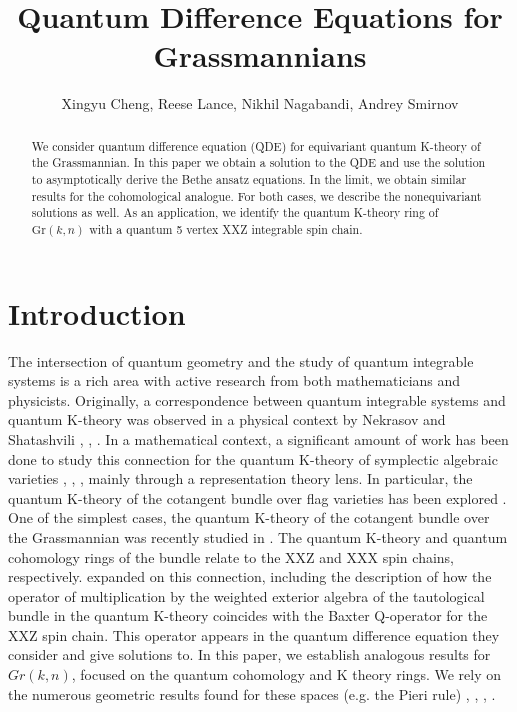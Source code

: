 \documentclass[12pt]{article}
\title{Quantum Difference Equations for Grassmannians}
\author{Xingyu Cheng, Reese Lance, Nikhil Nagabandi, Andrey Smirnov}
\date{}
\theoremstyle{plain}
\theoremstyle{definition}
\begin{document}
\maketitle


\begin{abstract}
    We consider quantum difference equation (QDE) for equivariant quantum K-theory of the Grassmannian. In this paper we obtain a solution to the QDE and use the solution to asymptotically derive the Bethe ansatz equations. In the limit, we obtain similar results for the cohomological analogue. For both cases, we describe the nonequivariant solutions as well. As an application, we identify the quantum K-theory ring of $\mathrm{Gr}(k,n)$ with a quantum 5 vertex XXZ integrable spin chain.
\end{abstract}
\tableofcontents


\section{Introduction}

The intersection of quantum geometry and the study of quantum integrable systems is a rich area with active research from both mathematicians and physicists. Originally, a correspondence between quantum integrable systems and quantum K-theory was observed in a physical context by Nekrasov and Shatashvili \cite{nekrasov2009}, \cite{nekrasovq2009}, \cite{nekrasov2010}. In a mathematical context, a significant amount of work has been done to study this connection for the quantum K-theory of symplectic algebraic varieties \cite{givental2001toda}, \cite{maulikokounkov}, \cite{Okounkov2022-tf}, mainly through a representation theory lens. 
In particular, the quantum K-theory of the cotangent bundle over flag varieties has been explored \cite{rimanyitarasovvarchenko}. One of the simplest cases, the quantum K-theory of the cotangent bundle over the Grassmannian was recently studied in \cite{pushkarsmirnovzeitlin}. The quantum K-theory and quantum cohomology rings of the bundle relate to the $\mathrm{XXZ}$ and $\mathrm{XXX}$ spin chains, respectively. \cite{pushkarsmirnovzeitlin} expanded on this connection, including the description of how the operator of multiplication by the weighted exterior algebra of the tautological bundle in the quantum K-theory coincides with the Baxter Q-operator for the XXZ spin chain. This operator appears in the quantum difference equation they consider and give solutions to. In this paper, we establish analogous results for $Gr(k,n)$, focused on the quantum cohomology and K theory rings. We rely on the numerous geometric results found for these spaces (e.g. the Pieri rule) \cite{givental2000wdvvequationquantumktheory}, \cite{buch2001quantumcohomologygrassmannians}, \cite{mihalcea2004equivariantquantumschubertcalculus}, \cite{Buch_2011}.
\end{document}
